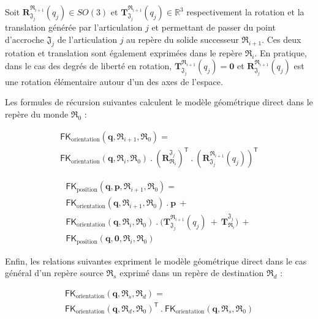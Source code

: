 Soit $\bm{R}_{\mathfrak{J}_{j}}^{\mathfrak{R}_{i+1}}(q_j) \in SO(3)$ et
$\bm{T}_{\mathfrak{J}_{j}}^{\mathfrak{R}_{i+1}}(q_j) \in \mathbb{R}^3$ respectivement
la rotation et la translation générée par l'articulation $j$ et permettant de passer du point
d'accroche $\mathfrak{J}_{j}$ de l'articulation $j$ au repère du solide successeur $\mathfrak{R}_{i+1}$.
Ces deux rotation et translation sont également exprimées dans le repère $\mathfrak{R}_{i}$.
En pratique, dans le cas des degrés de liberté en rotation, 
$\bm{T}_{\mathfrak{J}_{j}}^{\mathfrak{R}_{i+1}}(q_j) = \bm{0}$
et $\bm{R}_{\mathfrak{J}_{j}}^{\mathfrak{R}_{i+1}}(q_j)$ est une rotation élémentaire
autour d'un des axes de l'espace.

Les formules de récursion suivantes calculent le modèle géométrique direct
dans le repère du monde $\mathfrak{R}_0$ :

\begin{gather*}
\mathsf{FK}_{\text{orientation}}(\bm{q}, \mathfrak{R}_{i+1}, \mathfrak{R}_0) = \\
\mathsf{FK}_{\text{orientation}}(\bm{q}, \mathfrak{R}_{i}, \mathfrak{R}_0)~.~
(\bm{R}_{\mathfrak{R}_{i}}^{\mathfrak{J}_{j}})^{\mathsf{T}}~.~
(\bm{R}_{\mathfrak{J}_{j}}^{\mathfrak{R}_{i+1}}(q_j))^{\mathsf{T}}
\end{gather*}

\begin{gather*}
\mathsf{FK}_{\text{position}}(\bm{q}, \bm{p}, \mathfrak{R}_{i+1}, \mathfrak{R}_0) = \\
\mathsf{FK}_{\text{orientation}}(\bm{q}, \mathfrak{R}_{i+1}, \mathfrak{R}_0)~.~
\bm{p}
~+~ \\
\mathsf{FK}_{\text{orientation}}(\bm{q}, \mathfrak{R}_{i}, \mathfrak{R}_0)~.~
\big(
\bm{T}_{\mathfrak{J}_{j}}^{\mathfrak{R}_{i+1}}(q_j)~+~
\bm{T}_{\mathfrak{R}_{i}}^{\mathfrak{J}_{j}}
\big)
~+~ \\
\mathsf{FK}_{\text{position}}(\bm{q}, \bm{0}, \mathfrak{R}_{i}, \mathfrak{R}_0) 
\end{gather*}

Enfin, les relations suivantes expriment le modèle géométrique direct
dans le cas général d'un repère source $\mathfrak{R}_{s}$ exprimé dans un 
repère de destination $\mathfrak{R}_{d}$ :

\begin{gather*}
\mathsf{FK}_{\text{orientation}}(\bm{q}, \mathfrak{R}_{s}, \mathfrak{R}_{d}) = \\
\mathsf{FK}_{\text{orientation}}(\bm{q}, \mathfrak{R}_{d}, \mathfrak{R}_{0})^{\mathsf{T}}~.~
\mathsf{FK}_{\text{orientation}}(\bm{q}, \mathfrak{R}_{s}, \mathfrak{R}_{0})
\end{gather*}

